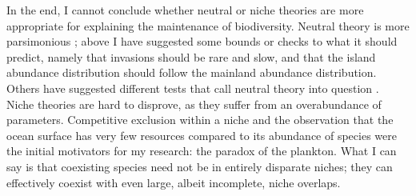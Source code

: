 

In the end, I cannot conclude whether neutral or niche theories are more appropriate for explaining the maintenance of biodiversity. 
Neutral theory is more parsimonious \cite{Leibold2006}; above I have suggested some bounds or checks to what it should predict, namely that invasions should be rare and slow, and that the island abundance distribution should follow the mainland abundance distribution. %
Others have suggested different tests that call neutral theory into question \cite{McGill2003,Ricklefs2006,Kelly2008,Adler2010,Rosindell2011,Carroll2015}. 
Niche theories are hard to disprove, as they suffer from an overabundance of parameters. 
Competitive exclusion within a niche and the observation that the ocean surface has very few resources compared to its abundance of species were the initial motivators for my research: the paradox of the plankton. 
What I can say is that coexisting species need not be in entirely disparate niches; they can effectively coexist with even large, albeit incomplete, niche overlaps. 




